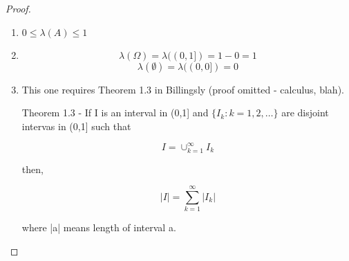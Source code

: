 \documentclass[11pt,fleqn]{book} %
\begin{document}
\begin{proof}
	\begin{enumerate}
		\item $0 \leq \lambda(A) \leq 1$

		\item $$\lambda(\Omega) = \lambda((0,1]) = 1-0 = 1$$
		$$\lambda(\emptyset) = \lambda((0,0]) = 0$$


		\item This one requires Theorem 1.3 in Billingsly (proof omitted - calculus, blah).

		Theorem 1.3 - If I is an interval in (0,1] and $\{I_k: k=1, 2, \dots \}$ are disjoint intervas in (0,1] such that 

		$$I = \cup^\infty_{k=1} I_k$$

		then, 

		$$|I| = \displaystyle \sum^\infty_{k=1} |I_k| $$

		where |a| means length of interval a. 
	\end{enumerate}
\end{proof}













\end{document}

